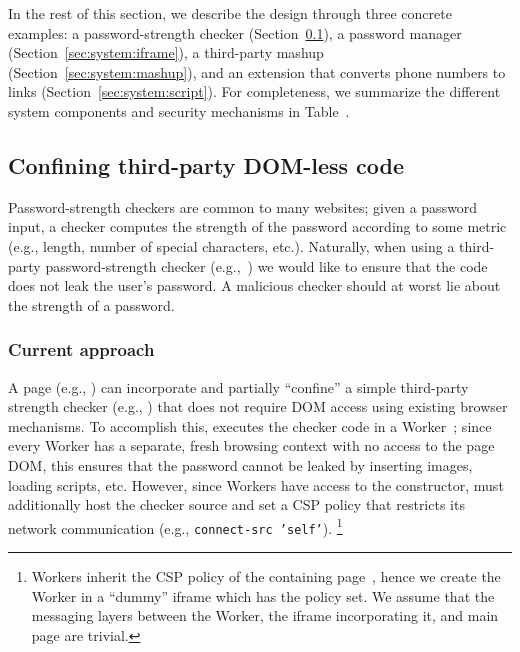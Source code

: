 In the rest of this section, we describe the \sys{} design through
three concrete examples: 
a password-strength checker (Section~\ref{sec:system:worker}),
a password manager (Section~\ref{sec:system:iframe}), 
a third-party mashup (Section~\ref{sec:system:mashup}), and
an extension that converts phone numbers to links
(Section~\ref{sec:system:script}).  %
%
For completeness, we summarize the different system components and
security mechanisms in Table~.



\subsection{Confining third-party DOM-less code}
\label{sec:system:worker}

Password-strength checkers are common to many websites;
%
given a password input, a checker computes the strength of the
password according to some metric (e.g., length, number of special
characters, etc.).
%
Naturally, when using a third-party password-strength checker
(e.g.,~) we would like to ensure that the
code does not leak the user's password.
%
A malicious checker should at worst lie about the strength of a
password.

\subsubsection{Current approach}
%
A page (e.g., ) can incorporate and partially
``confine'' a simple third-party strength checker (e.g.,
) that does not require DOM access using
existing browser mechanisms.
%
To accomplish this,  executes the checker code in a
Worker~;
%
since every Worker has a separate, fresh browsing context with no access
to the page DOM, this ensures that the password cannot be leaked by
inserting images, loading scripts, etc.
%
However, since Workers have access to the \xhr{} constructor,
 must additionally host the checker source and set
a CSP policy that restricts its network communication (e.g.,
\texttt{connect-src 'self'}).
\footnote{
  Workers inherit the CSP policy of the containing page~,
  hence we create the Worker in a ``dummy'' iframe which has the
  policy set.
  We assume that the messaging layers between the Worker, the iframe
  incorporating it, and main page are trivial.
}
%

